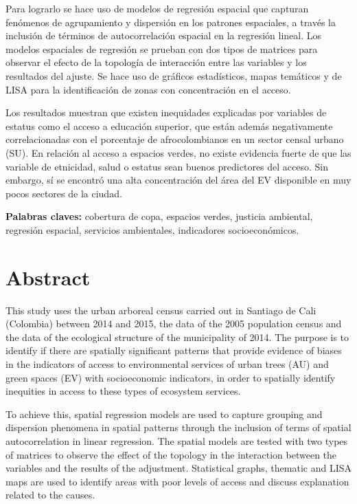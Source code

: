 \documentclass[12pt,a4paper,oneside, openany]{book}
\theoremstyle{definition}
\theoremstyle{definition}
\theoremstyle{definition}
\theoremstyle{remark}
\begin{document}
Para lograrlo se hace uso de modelos de regresión espacial que capturan
fenómenos de agrupamiento y dispersión en los patrones espaciales, a
través la inclusión de términos de autocorrelación espacial en la
regresión lineal. Los modelos espaciales de regresión se prueban con dos
tipos de matrices para observar el efecto de la topología de interacción
entre las variables y los resultados del ajuste. Se hace uso de gráficos
estadísticos, mapas temáticos y de LISA para la identificación de zonas
con concentración en el acceso.

Los resultados muestran que existen inequidades explicadas por variables
de estatus como el acceso a educación superior, que están además
negativamente correlacionadas con el porcentaje de afrocolombianos en un
sector censal urbano (SU). En relación al acceso a espacios verdes, no
existe evidencia fuerte de que las variable de etnicidad, salud o
estatus sean buenos predictores del acceso. Sin embargo, sí se encontró
una alta concentración del área del EV disponible en muy pocos sectores
de la ciudad.

\textbf{Palabras claves:} cobertura de copa, espacios verdes, justicia
ambiental, regresión espacial, servicios ambientales, indicadores
socioeconómicos.

\chapter*{Abstract}\label{abstract}


This study uses the urban arboreal census carried out in Santiago de
Cali (Colombia) between 2014 and 2015, the data of the 2005 population
census and the data of the ecological structure of the municipality of
2014. The purpose is to identify if there are spatially significant
patterns that provide evidence of biases in the indicators of access to
environmental services of urban trees (AU) and green spaces (EV) with
socioeconomic indicators, in order to spatially identify inequities in
access to these types of ecosystem services.

To achieve this, spatial regression models are used to capture grouping
and dispersion phenomena in spatial patterns through the inclusion of
terms of spatial autocorrelation in linear regression. The spatial
models are tested with two types of matrices to observe the effect of
the topology in the interaction between the variables and the results of
the adjustment. Statistical graphs, thematic and LISA maps are used to
identify areas with poor levels of access and discuss explanation
related to the causes.
\end{document}

